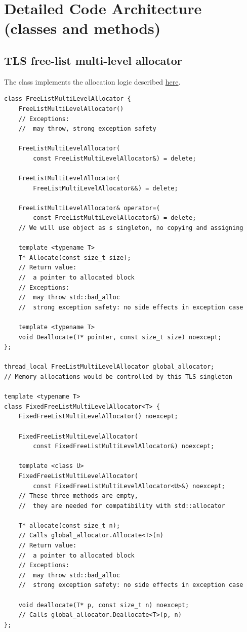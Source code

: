 \documentclass{article}
\begin{document}
\section{Detailed Code Architecture (classes and methods)}

\subsection{TLS free-list multi-level allocator}

The class implements the allocation logic described \hyperref[free_list_algo]{here}.

\begin{lstlisting}
class FreeListMultiLevelAllocator {
	FreeListMultiLevelAllocator()
	// Exceptions:
	// 	may throw, strong exception safety

	FreeListMultiLevelAllocator(
		const FreeListMultiLevelAllocator&) = delete;

	FreeListMultiLevelAllocator(
		FreeListMultiLevelAllocator&&) = delete;

	FreeListMultiLevelAllocator& operator=(
		const FreeListMultiLevelAllocator&) = delete;
	// We will use object as s singleton, no copying and assigning

	template <typename T>
	T* Allocate(const size_t size);
	// Return value:
	// 	a pointer to allocated block
	// Exceptions:
	// 	may throw std::bad_alloc
	// 	strong exception safety: no side effects in exception case

	template <typename T>
	void Deallocate(T* pointer, const size_t size) noexcept;
};

thread_local FreeListMultiLevelAllocator global_allocator;
// Memory allocations would be controlled by this TLS singleton

template <typename T>
class FixedFreeListMultiLevelAllocator<T> {
	FixedFreeListMultiLevelAllocator() noexcept;

	FixedFreeListMultiLevelAllocator(
		const FixedFreeListMultiLevelAllocator&) noexcept;

	template <class U>
	FixedFreeListMultiLevelAllocator(
		const FixedFreeListMultiLevelAllocator<U>&) noexcept;
	// These three methods are empty,
	// 	they are needed for compatibility with std::allocator

	T* allocate(const size_t n);
	// Calls global_allocator.Allocate<T>(n)
	// Return value:
	// 	a pointer to allocated block
	// Exceptions:
	// 	may throw std::bad_alloc
	// 	strong exception safety: no side effects in exception case

	void deallocate(T* p, const size_t n) noexcept;
	// Calls global_allocator.Deallocate<T>(p, n)
};
\end{lstlisting}
\end{document}
